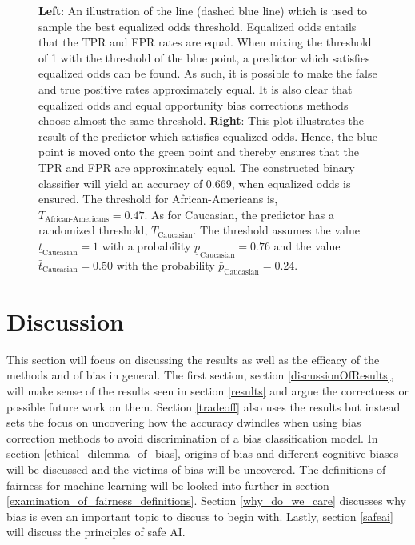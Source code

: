 \documentclass[11pt, fleqn, titlepage]{article}
\begin{document}
\begin{figure}[H]
		\caption{\textbf{Left}: An illustration of the line (dashed blue line) which is used to sample the best equalized odds threshold. Equalized odds entails that the TPR and FPR rates are equal. When mixing the threshold of 1 with the threshold of the blue point, a predictor which satisfies equalized odds can be found. As such, it is possible to make the false and true positive rates approximately equal. It is also clear that equalized odds and equal opportunity bias corrections methods choose almost the same threshold.  \textbf{Right}: This plot illustrates the result of the predictor which satisfies equalized odds. Hence, the blue point is moved onto the green point and thereby ensures that the TPR and FPR are approximately equal. The constructed binary classifier will yield an accuracy of $ 0.669 $, when equalized odds is ensured. The threshold for African-Americans is, $ T_{\text{African-Americans}} = 0.47 $. As for Caucasian, the predictor has a randomized threshold, $ T_{\text{Caucasian}} $. The threshold assumes the value $\underline t_{\text{Caucasian}} = 1 $  with a probability $ \underline p_{\text{Caucasian}}= 0.76 $ and the value $ \bar t_{\text{Caucasian}} = 0.50 $ with the probability $\bar p_{\text{Caucasian}} = 0.24 $.}
		\label{fig:equalizedOdds}
	\end{figure}
	
	\section{Discussion} \label{discussion}
	
	This section will focus on discussing the results as well as the efficacy of the methods and of bias in general. The first section, section \ref{discussionOfResults}, will make sense of the results seen in section \ref{results} and argue the correctness or possible future work on them. Section \ref{tradeoff} also uses the results but instead sets the focus on uncovering how the accuracy dwindles when using bias correction methods to avoid discrimination of a bias classification model. In section \ref{ethical_dilemma_of_bias}, origins of bias and different cognitive biases will be discussed and the victims of bias will be uncovered. The definitions of fairness for machine learning will be looked into further in section \ref{examination_of_fairness_definitions}. Section \ref{why_do_we_care} discusses why bias is even an important topic to discuss to begin with. Lastly, section \ref{safeai} will discuss the principles of safe AI.
	
\end{document}
